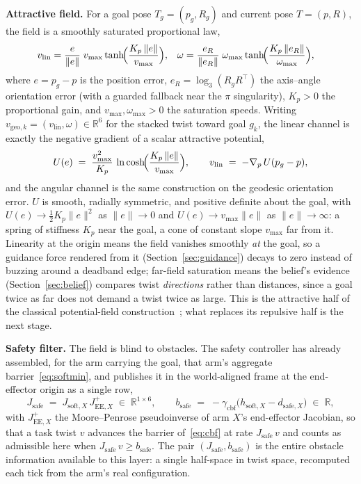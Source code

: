 \documentclass[12pt,a4paper,twoside,openright]{report}
\begin{document}
\textbf{Attractive field.} For a goal pose $T_g = (p_g, R_g)$ and current pose $T = (p, R)$, the field is a smoothly saturated proportional law,
\begin{align}
v_{\text{lin}} &= \frac{e}{\|e\|}\; v_{\max}\tanh\!\Bigl(\frac{K_p\,\|e\|}{v_{\max}}\Bigr),
&
\omega &= \frac{e_R}{\|e_R\|}\; \omega_{\max}\tanh\!\Bigl(\frac{K_p\,\|e_R\|}{\omega_{\max}}\Bigr),
\label{eq:vgeo}
\end{align}
where $e = p_g - p$ is the position error, $e_R = \log_3(R_g R^{\top})$ the axis--angle orientation error (with a guarded fallback near the $\pi$ singularity), $K_p > 0$ the proportional gain, and $v_{\max}, \omega_{\max} > 0$ the saturation speeds. Writing $v_{\text{geo},k} = (v_{\text{lin}}, \omega) \in \mathbb{R}^6$ for the stacked twist toward goal $g_k$, the linear channel is exactly the negative gradient of a scalar attractive potential,
\begin{equation}
U(e) \;=\; \frac{v_{\max}^{2}}{K_p}\,\ln\cosh\!\Bigl(\frac{K_p\,\|e\|}{v_{\max}}\Bigr),
\qquad
v_{\text{lin}} \;=\; -\nabla_{p}\,U(p_g - p),
\label{eq:attpot}
\end{equation}
and the angular channel is the same construction on the geodesic orientation error. $U$ is smooth, radially symmetric, and positive definite about the goal, with $U(e) \to \tfrac{1}{2}K_p\|e\|^{2}$ as $\|e\| \to 0$ and $U(e) \to v_{\max}\|e\|$ as $\|e\| \to \infty$: a spring of stiffness $K_p$ near the goal, a cone of constant slope $v_{\max}$ far from it. Linearity at the origin means the field vanishes smoothly \emph{at} the goal, so a guidance force rendered from it (Section~\ref{sec:guidance}) decays to zero instead of buzzing around a deadband edge; far-field saturation means the belief's evidence (Section~\ref{sec:belief}) compares twist \emph{directions} rather than distances, since a goal twice as far does not demand a twist twice as large. This is the attractive half of the classical potential-field construction~\cite{khatib1986}; what replaces its repulsive half is the next stage.

\textbf{Safety filter.} The field is blind to obstacles. The safety controller has already assembled, for the arm carrying the goal, that arm's aggregate barrier~\eqref{eq:softmin}, and publishes it in the world-aligned frame at the end-effector origin as a single row,
\begin{equation}
J_{\text{safe}} \;=\; J_{\text{soft},X}\,J_{\text{EE},X}^{+} \;\in\; \mathbb{R}^{1\times 6},
\qquad
b_{\text{safe}} \;=\; -\gamma_{\text{cbf}}\bigl(h_{\text{soft},X} - d_{\text{safe},X}\bigr) \;\in\; \mathbb{R},
\label{eq:jsafe}
\end{equation}
with $J_{\text{EE},X}^{+}$ the Moore--Penrose pseudoinverse of arm $X$'s end-effector Jacobian, so that a task twist $v$ advances the barrier of~\eqref{eq:cbf} at rate $J_{\text{safe}}\,v$ and counts as admissible here when $J_{\text{safe}}\,v \ge b_{\text{safe}}$. The pair $(J_{\text{safe}}, b_{\text{safe}})$ is the entire obstacle information available to this layer: a single half-space in twist space, recomputed each tick from the arm's real configuration.
\end{document}
